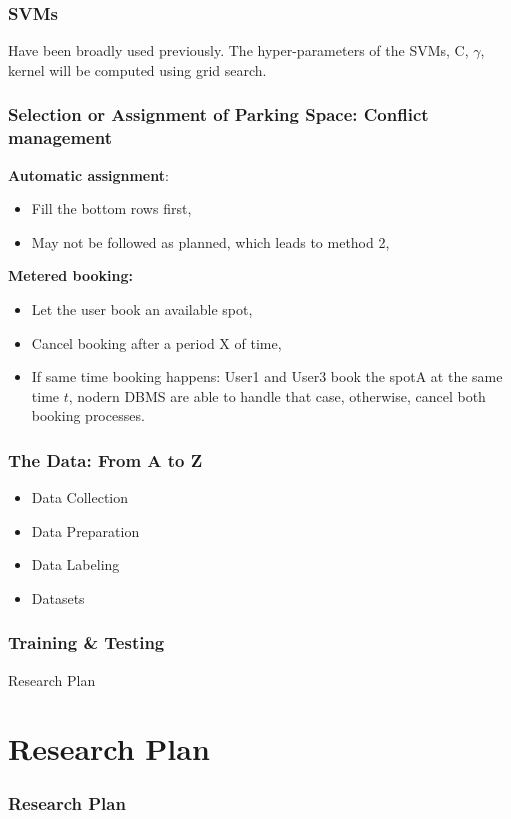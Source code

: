 \documentclass{beamer}
\begin{document}
\begin{frame}
\frametitle{SVMs}
Have been broadly used previously. The hyper-parameters of the SVMs, C, $\gamma$, kernel will be computed using grid search. 
\end{frame}

\begin{frame}
\frametitle{Selection or Assignment of Parking Space: Conflict management}
\textbf{Automatic assignment}: 
\begin{itemize}
	\item Fill the bottom rows first,
	\item May not be followed as planned, which leads to method 2,
\end{itemize}

\textbf{Metered booking: }
\begin{itemize}
	\item Let the user book an available spot,
	\item Cancel booking after a period X of time,
	\item If same time booking happens: User1 and User3 book the spotA at the same time $t$, nodern DBMS are able to handle that case, otherwise, cancel both booking processes.
\end{itemize}
\end{frame}

\begin{frame}
\frametitle{The Data: From A to Z} 
\begin{itemize}
	\item Data Collection
	\item Data Preparation
	\item Data Labeling
	\item Datasets
\end{itemize}
\end{frame}

\begin{frame}
\frametitle{Training \& Testing} 
\end{frame}

\begin{frame}[allowframebreaks]
\Huge Research Plan
\end{frame}



\section{Research Plan}

\begin{frame}
\frametitle{Research Plan}
\end{frame}
\end{document}
